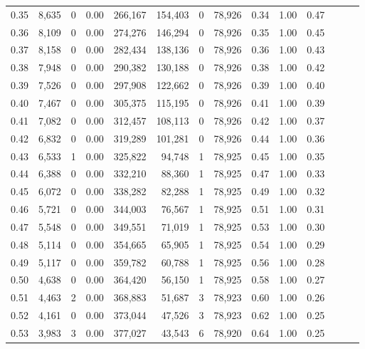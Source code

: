\begin{tabular}{rrrrrrrrrrrrrr}
0.35 &  8,635 &      0 &  0.00 &  266,167 &  154,403 &       0 &  78,926 &  0.34 &  1.00 &      0.47 \\
0.36 &  8,109 &      0 &  0.00 &  274,276 &  146,294 &       0 &  78,926 &  0.35 &  1.00 &      0.45 \\
0.37 &  8,158 &      0 &  0.00 &  282,434 &  138,136 &       0 &  78,926 &  0.36 &  1.00 &      0.43 \\
0.38 &  7,948 &      0 &  0.00 &  290,382 &  130,188 &       0 &  78,926 &  0.38 &  1.00 &      0.42 \\
0.39 &  7,526 &      0 &  0.00 &  297,908 &  122,662 &       0 &  78,926 &  0.39 &  1.00 &      0.40 \\
0.40 &  7,467 &      0 &  0.00 &  305,375 &  115,195 &       0 &  78,926 &  0.41 &  1.00 &      0.39 \\
0.41 &  7,082 &      0 &  0.00 &  312,457 &  108,113 &       0 &  78,926 &  0.42 &  1.00 &      0.37 \\
0.42 &  6,832 &      0 &  0.00 &  319,289 &  101,281 &       0 &  78,926 &  0.44 &  1.00 &      0.36 \\
0.43 &  6,533 &      1 &  0.00 &  325,822 &   94,748 &       1 &  78,925 &  0.45 &  1.00 &      0.35 \\
0.44 &  6,388 &      0 &  0.00 &  332,210 &   88,360 &       1 &  78,925 &  0.47 &  1.00 &      0.33 \\
0.45 &  6,072 &      0 &  0.00 &  338,282 &   82,288 &       1 &  78,925 &  0.49 &  1.00 &      0.32 \\
0.46 &  5,721 &      0 &  0.00 &  344,003 &   76,567 &       1 &  78,925 &  0.51 &  1.00 &      0.31 \\
0.47 &  5,548 &      0 &  0.00 &  349,551 &   71,019 &       1 &  78,925 &  0.53 &  1.00 &      0.30 \\
0.48 &  5,114 &      0 &  0.00 &  354,665 &   65,905 &       1 &  78,925 &  0.54 &  1.00 &      0.29 \\
0.49 &  5,117 &      0 &  0.00 &  359,782 &   60,788 &       1 &  78,925 &  0.56 &  1.00 &      0.28 \\
0.50 &  4,638 &      0 &  0.00 &  364,420 &   56,150 &       1 &  78,925 &  0.58 &  1.00 &      0.27 \\
0.51 &  4,463 &      2 &  0.00 &  368,883 &   51,687 &       3 &  78,923 &  0.60 &  1.00 &      0.26 \\
0.52 &  4,161 &      0 &  0.00 &  373,044 &   47,526 &       3 &  78,923 &  0.62 &  1.00 &      0.25 \\
0.53 &  3,983 &      3 &  0.00 &  377,027 &   43,543 &       6 &  78,920 &  0.64 &  1.00 &      0.25 \\

\end{tabular}
